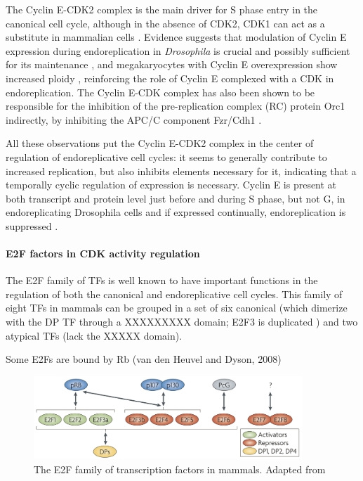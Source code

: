 \documentclass[11pt,twoside,a4paper]{report}
\begin{document}
				The Cyclin E-CDK2 complex is the main driver for S phase entry in the canonical cell cycle, although in the absence of CDK2, CDK1 can act as a substitute in mammalian cells \cite{Ullah2009}. Evidence suggests that modulation of Cyclin E expression during endoreplication in \textit{Drosophila} is crucial and possibly sufficient for its maintenance \cite{Lilly2005}, and megakaryocytes with Cyclin E overexpression show increased ploidy \cite{Eliades2010}, reinforcing the role of Cyclin E complexed with a CDK in endoreplication. The Cyclin E-CDK complex has also been shown to be responsible for the inhibition of the pre-replication complex (RC) protein Orc1 indirectly, by inhibiting the APC/C component  Fzr/Cdh1 \cite{Narbonne-Reveau2008}.
			
				All these observations put the Cyclin E-CDK2 complex in the center of regulation of endoreplicative cell cycles: it seems to generally contribute to increased replication, but also inhibits elements necessary for it, indicating that a temporally cyclic regulation of expression is necessary. Cyclin E is present at both transcript and protein level just before and during S phase, but not G, in endoreplicating Drosophila cells \cite{Weng2003} and if expressed continually, endoreplication is suppressed \cite{Weiss}.
			
				\paragraph{E2F factors in CDK activity regulation}
			
				 The E2F family of TFs is well known to have important functions in the regulation of both the canonical and endoreplicative cell cycles. This family of eight TFs in mammals can be grouped in a set of six canonical (which dimerize with the DP TF through a XXXXXXXXX domain; E2F3 is duplicated ) and two atypical TFs (lack the XXXXX domain).
							
				Some E2Fs are bound by Rb (van den Heuvel and Dyson, 2008)
			
				\begin{figure}[here]
					\centering
					\includegraphics[width=0.9\textwidth]{pngs/E2F_family.png}
					\caption{The E2F family of transcription factors in mammals. {\footnotesize Adapted from \cite{VandenHeuvel2008}}}
					\label{fig:E2F_family}
				\end{figure}
				
\end{document}
